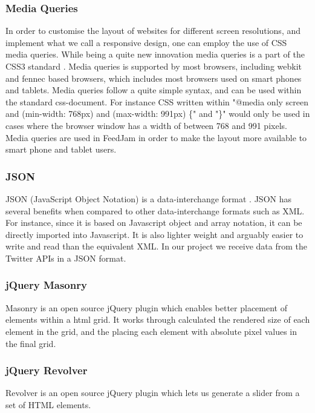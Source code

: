 \subsubsection{Media Queries} %
In order to customise the layout of websites for different screen resolutions, and implement what we call a responsive design, one can employ the use of CSS media queries. While being a quite new innovation media queries is a part of the CSS3 standard \cite{W3C}. Media queries is supported by most browsers, including webkit and fennec based browsers, which includes most browsers used on smart phones and tablets. Media queries follow a quite simple syntax, and can be used within the standard css-document. For instance CSS written within "@media only screen and (min-width: 768px) and (max-width: 991px) \{" and "\}" would only be used in cases where the browser window has a width of between 768 and 991 pixels. Media queries are used in FeedJam in order to make the layout more available to smart phone and tablet users.

\subsubsection{JSON}
JSON (JavaScript Object Notation) is a data-interchange format \cite{Crockford2011}. JSON has several benefits when compared to other data-interchange formats such as XML. For instance, since it is based on Javascript object and array notation, it can be directly imported into Javascript. It is also lighter weight and arguably easier to write and read than the equivalent XML. In our project we receive data from the Twitter APIs in a JSON format.

\subsubsection{jQuery Masonry}
Masonry is an open source jQuery plugin which enables better placement of elements within a html grid. It works through calculated the rendered size of each element in the grid, and the placing each element with absolute pixel values in the final grid.

\subsubsection{jQuery Revolver}
Revolver is an open source jQuery plugin which lets us generate a slider from a set of HTML elements.

